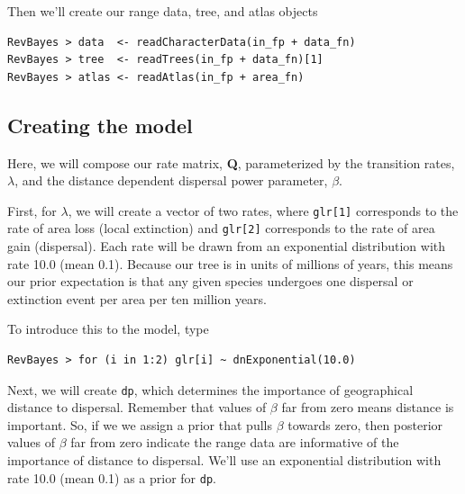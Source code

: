 \documentclass[11pt]{article}
\begin{document}
Then we'll create our range data, tree, and atlas objects

\begin{snugshade}
\begin{lstlisting}
RevBayes > data  <- readCharacterData(in_fp + data_fn)
RevBayes > tree  <- readTrees(in_fp + data_fn)[1]
RevBayes > atlas <- readAtlas(in_fp + area_fn)
\end{lstlisting}
\end{snugshade}

%


\subsection{Creating the model}

Here, we will compose our rate matrix, {\bf Q}, parameterized by the transition rates, $\lambda$, and the distance dependent dispersal power parameter, $\beta$.

First, for $\lambda$, we will create a vector of two rates, where {\tt glr[1]} corresponds to the rate of area loss (local extinction) and {\tt glr[2]} corresponds to the rate of area gain (dispersal).
Each rate will be drawn from an exponential distribution with rate 10.0 (mean 0.1).
Because our tree is in units of millions of years, this means our prior expectation is that any given species undergoes one dispersal or extinction event per area per ten million years.

To introduce this to the model, type
\begin{snugshade}
\begin{lstlisting}
RevBayes > for (i in 1:2) glr[i] ~ dnExponential(10.0)
\end{lstlisting}
\end{snugshade}

Next, we will create {\tt dp}, which determines the importance of geographical distance to dispersal.
Remember that values of $\beta$ far from zero means distance is important.
So, if we we assign a prior that pulls $\beta$ towards zero, then posterior values of $\beta$ far from zero indicate the range data are informative of the importance of distance to dispersal.
We'll use an exponential distribution with rate 10.0 (mean 0.1) as a prior for {\tt dp}.
\end{document}

